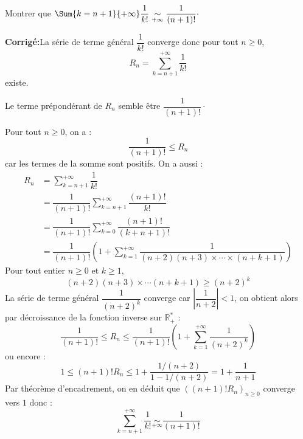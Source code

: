 \documentclass[a4paper,twoside,french,10pt]{VcCours}
\newcommand{\corr}{\textbf{Corrigé:}}
\begin{document}
\medskip


\begin{Exercice}{} Montrer que $\Sum{k=n+1}{+ \infty} \dfrac{1}{k!} \underset{ + \infty}{\sim} \dfrac{1}{(n+1)!} \cdot$ \end{Exercice}

\corr La série de terme général $\dfrac{1}{k!}$ converge donc pour tout $n \geq 0$,
$$ R_n = \sum_{k=n+1}^{+ \infty} \dfrac{1}{k!}$$
existe. 

\medskip

\noindent Le terme prépondérant de $R_n$ semble être $\dfrac{1}{(n+1)!}\cdot$

\medskip

\noindent Pour tout $n \geq 0$, on a :
$$ \dfrac{1}{(n+1)!} \leq R_n$$
car les termes de la somme sont positifs. On a aussi :
\begin{align*}
R_n & = \sum_{k=n+1}^{+ \infty} \dfrac{1}{k!} \\
& = \dfrac{1}{(n+1)!} \sum_{k=n+1}^{+ \infty} \dfrac{(n+1)!}{k!} \\
& = \dfrac{1}{(n+1)!} \sum_{k=0}^{+ \infty} \dfrac{(n+1)!}{(k+n+1)!} \\
& = \dfrac{1}{(n+1)!} \left(1 + \sum_{k=1}^{+ \infty} \dfrac{1}{(n+2)(n+3) \times \cdots \times (n+k+1)} \right)
\end{align*}
Pour tout entier $n \geq 0$ et $k \geq 1$,
$$ (n+2)(n+3) \times \cdots (n+k+1) \geq (n+2)^k$$
La série de terme général $\dfrac{1}{(n+2)^k}$ converge car $\left\vert \dfrac{1}{n+2} \right\vert<1$, on obtient alors par décroissance de la fonction inverse sur $\mathbb{R}_+^*$ :
$$ \dfrac{1}{(n+1)!} \leq R_n \leq \dfrac{1}{(n+1)!} \left(1+ \sum_{k=1}^{+ \infty} \dfrac{1}{(n+2)^k} \right)$$
ou encore :
$$ 1 \leq (n+1)! R_n \leq 1 + \dfrac{1/(n+2)}{1-1/(n+2)} = 1 + \dfrac{1}{n+1}$$
Par théorème d'encadrement, on en déduit que $((n+1)! R_n)_{n \geq 0}$ converge vers $1$ donc :
$$ \sum_{k=n+1}^{+ \infty} \dfrac{1}{k!} \underset{ + \infty}{\sim} \dfrac{1}{(n+1)!}$$
\end{document}
